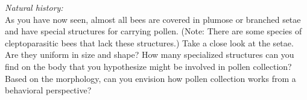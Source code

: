 \documentclass[letterpaper, 11pt]{article}
\begin{document}
\noindent{}\textit{Natural history:} \\

\noindent{}As you have now seen, almost all bees are covered in plumose or branched setae and have special structures for carrying pollen. (Note: There are some species of cleptoparasitic bees that lack these structures.) Take a close look at the setae. Are they uniform in size and shape? How many specialized structures can you find on the body that you hypothesize might be involved in pollen collection? Based on the morphology, can you envision how pollen collection works from a behavioral perspective?

\FloatBarrier


\end{document}
